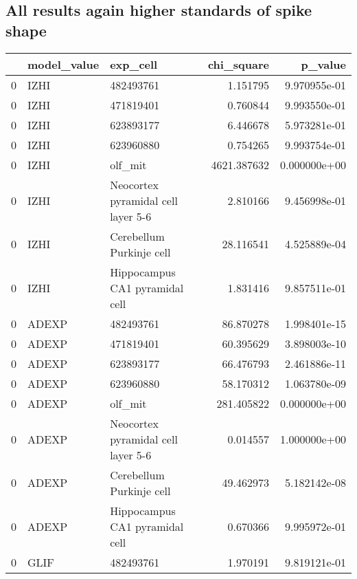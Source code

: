 \subsection{All results again higher standards of spike shape}
\begin{tabular}{lllrr}
\toprule
{} & model\_value &                            exp\_cell &   chi\_square &       p\_value \\
\midrule
0 &        IZHI &                           482493761 &     1.151795 &  9.970955e-01 \\
0 &        IZHI &                           471819401 &     0.760844 &  9.993550e-01 \\
0 &        IZHI &                           623893177 &     6.446678 &  5.973281e-01 \\
0 &        IZHI &                           623960880 &     0.754265 &  9.993754e-01 \\
0 &        IZHI &                             olf\_mit &  4621.387632 &  0.000000e+00 \\
0 &        IZHI &  Neocortex pyramidal cell layer 5-6 &     2.810166 &  9.456998e-01 \\
0 &        IZHI &            Cerebellum Purkinje cell &    28.116541 &  4.525889e-04 \\
0 &        IZHI &      Hippocampus CA1 pyramidal cell &     1.831416 &  9.857511e-01 \\
0 &       ADEXP &                           482493761 &    86.870278 &  1.998401e-15 \\
0 &       ADEXP &                           471819401 &    60.395629 &  3.898003e-10 \\
0 &       ADEXP &                           623893177 &    66.476793 &  2.461886e-11 \\
0 &       ADEXP &                           623960880 &    58.170312 &  1.063780e-09 \\
0 &       ADEXP &                             olf\_mit &   281.405822 &  0.000000e+00 \\
0 &       ADEXP &  Neocortex pyramidal cell layer 5-6 &     0.014557 &  1.000000e+00 \\
0 &       ADEXP &            Cerebellum Purkinje cell &    49.462973 &  5.182142e-08 \\
0 &       ADEXP &      Hippocampus CA1 pyramidal cell &     0.670366 &  9.995972e-01 \\
0 &        GLIF &                           482493761 &     1.970191 &  9.819121e-01 \\

\end{tabular}
